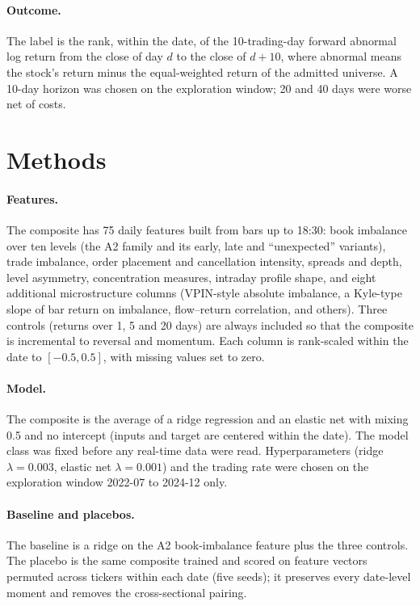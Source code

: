 \documentclass[11pt]{article}
\begin{document}
\paragraph{Outcome.} The label is the rank, within the date, of the 10-trading-day forward abnormal log return from the close of day $d$ to the close of $d+10$, where abnormal means the stock's return minus the equal-weighted return of the admitted universe. A 10-day horizon was chosen on the exploration window; 20 and 40 days were worse net of costs.

\section{Methods}\label{sec:methods}

\paragraph{Features.} The composite has 75 daily features built from bars up to 18:30: book imbalance over ten levels (the A2 family and its early, late and ``unexpected'' variants), trade imbalance, order placement and cancellation intensity, spreads and depth, level asymmetry, concentration measures, intraday profile shape, and eight additional microstructure columns (VPIN-style absolute imbalance, a Kyle-type slope of bar return on imbalance, flow--return correlation, and others). Three controls (returns over 1, 5 and 20 days) are always included so that the composite is incremental to reversal and momentum. Each column is rank-scaled within the date to $[-0.5,0.5]$, with missing values set to zero.

\paragraph{Model.} The composite is the average of a ridge regression \citep{hoerl1970ridge} and an elastic net \citep{zou2005elastic} with mixing 0.5 and no intercept (inputs and target are centered within the date). The model class was fixed before any real-time data were read. Hyperparameters (ridge $\lambda=0.003$, elastic net $\lambda=0.001$) and the trading rate were chosen on the exploration window 2022-07 to 2024-12 only.

\paragraph{Baseline and placebos.} The baseline is a ridge on the A2 book-imbalance feature plus the three controls. The placebo is the same composite trained and scored on feature vectors permuted across tickers within each date (five seeds); it preserves every date-level moment and removes the cross-sectional pairing.
\end{document}
